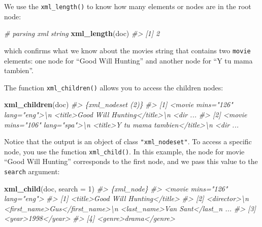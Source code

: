 \documentclass[
]{book}
\newenvironment{Shaded}{\begin{snugshade}}{\end{snugshade}}
\newcommand{\AttributeTok}[1]{\textcolor[rgb]{0.13,0.29,0.53}{#1}}
\newcommand{\CommentTok}[1]{\textcolor[rgb]{0.56,0.35,0.01}{\textit{#1}}}
\newcommand{\DecValTok}[1]{\textcolor[rgb]{0.00,0.00,0.81}{#1}}
\newcommand{\FunctionTok}[1]{\textcolor[rgb]{0.13,0.29,0.53}{\textbf{#1}}}
\newcommand{\NormalTok}[1]{#1}
\begin{document}
We use the \texttt{xml\_length()} to know how many elements or nodes are in the root
node:

\begin{Shaded}
\begin{Highlighting}[]
\CommentTok{\# parsing xml string}
\FunctionTok{xml\_length}\NormalTok{(doc)}
\CommentTok{\#\textgreater{} [1] 2}
\end{Highlighting}
\end{Shaded}

which confirms what we know about the movies string that contains two \texttt{movie}
elements: one node for ``Good Will Hunting'' and another node for ``Y tu mama
tambien''.

The function \texttt{xml\_children()} allows you to access the children nodes:

\begin{Shaded}
\begin{Highlighting}[]
\FunctionTok{xml\_children}\NormalTok{(doc)}
\CommentTok{\#\textgreater{} \{xml\_nodeset (2)\}}
\CommentTok{\#\textgreater{} [1] \textless{}movie mins="126" lang="eng"\textgreater{}\textbackslash{}n  \textless{}title\textgreater{}Good Will Hunting\textless{}/title\textgreater{}\textbackslash{}n  \textless{}dir ...}
\CommentTok{\#\textgreater{} [2] \textless{}movie mins="106" lang="spa"\textgreater{}\textbackslash{}n  \textless{}title\textgreater{}Y tu mama tambien\textless{}/title\textgreater{}\textbackslash{}n  \textless{}dir ...}
\end{Highlighting}
\end{Shaded}

Notice that the output is an object of class \texttt{"xml\_nodeset"}. To access a
specific node, you use the function \texttt{xml\_child()}. In this example, the node
for movie ``Good Will Hunting'' corresponds to the first node, and we pass this
value to the \texttt{search} argument:

\begin{Shaded}
\begin{Highlighting}[]
\FunctionTok{xml\_child}\NormalTok{(doc, }\AttributeTok{search =} \DecValTok{1}\NormalTok{)}
\CommentTok{\#\textgreater{} \{xml\_node\}}
\CommentTok{\#\textgreater{} \textless{}movie mins="126" lang="eng"\textgreater{}}
\CommentTok{\#\textgreater{} [1] \textless{}title\textgreater{}Good Will Hunting\textless{}/title\textgreater{}}
\CommentTok{\#\textgreater{} [2] \textless{}director\textgreater{}\textbackslash{}n  \textless{}first\_name\textgreater{}Gus\textless{}/first\_name\textgreater{}\textbackslash{}n  \textless{}last\_name\textgreater{}Van Sant\textless{}/last\_n ...}
\CommentTok{\#\textgreater{} [3] \textless{}year\textgreater{}1998\textless{}/year\textgreater{}}
\CommentTok{\#\textgreater{} [4] \textless{}genre\textgreater{}drama\textless{}/genre\textgreater{}}
\end{Highlighting}
\end{Shaded}
\end{document}
